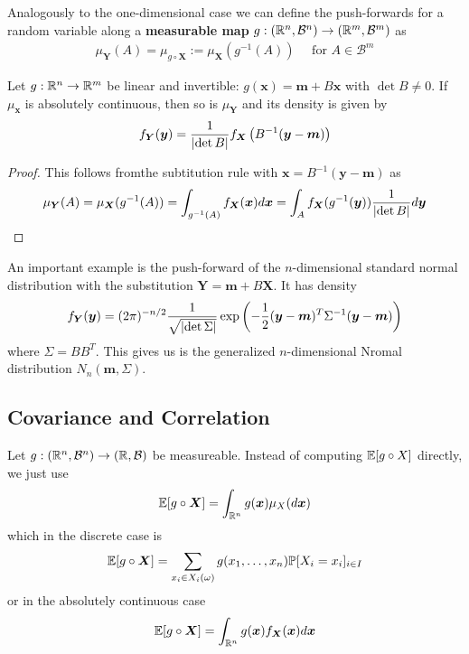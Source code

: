 Analogously to the one-dimensional case we can define the push-forwards for a random variable along a \textbf{measurable map} $g: (\mathbb{R}^{n},\mathcal{B}^{n}) \to (\mathbb{R}^{m},\mathcal{B}^{m})$ as
\begin{align*}
  \mu_{\bm{Y}}(A) = \mu_{g \circ \bm{X}} := \mu_{\bm{X}}(g^{-1}(A)) \quad\text{ for } A \in \mathcal{B}^{m}
\end{align*}

\begin{prop}[]
  Let $g: \mathbb{R}^{n} \to \mathbb{R}^{m}$ be linear and invertible: $g(\bm{x}) = \bm{m} + B \bm{x}$ with $\det B \neq 0$.
  If $\mu_{\bm{x}}$ is absolutely continuous, then so is $\mu_{\bm{Y}}$ and its density is given by
  \begin{align*}
    f_{\bm{Y}}(\bm{y}) = \frac{1}{\abs{\det B}} f_{\bm{X}}\left(
      B^{-1}(\bm{y} - \bm{m})
    \right)
  \end{align*}
\end{prop}
\begin{proof}
  This follows fromthe subtitution rule with $\bm{x} = B^{-1}(\bm{y} - \bm{m})$ as
  \begin{align*}
    \mu_{\bm{Y}}(A) = \mu_{\bm{X}}(g^{-1}(A)) = \int_{g^{-1}(A)}f_{\bm{X}}(\bm{x}) d \bm{x} = \int_A f_{\bm{X}}(g^{-1}(\bm{y})) \frac{1}{\abs{\det B}} d \bm{y}
  \end{align*}
\end{proof}

\begin{ex}[]
An important example is the push-forward of the $n$-dimensional standard normal distribution with the substitution $\bm{Y} = \bm{m} + B \bm{X}$.
It has density
\begin{align*}
  f_{\bm{Y}}(\bm{y}) = (2 \pi)^{-n/2} \frac{1}{\sqrt{\abs{\det \Sigma}}} \exp\left(
    - \frac{1}{2} (\bm{y} - \bm{m})^{T} \Sigma^{-1}(\bm{y} - \bm{m})
  \right)
\end{align*}
where $\Sigma = BB^{T}$.
This gives us is the generalized $n$-dimensional Nromal distribution $N_n(\bm{m},\Sigma)$.
\end{ex}

\subsection{Covariance and Correlation}
Let $g: (\mathbb{R}^{n}, \mathcal{B}^{n}) \to (\mathbb{R},\mathcal{B})$ be measureable. 
Instead of computing $\mathbb{E}[g \circ X]$ directly, we just use
\begin{align*}
  \mathbb{E}[g \circ \bm{X}] = \int_{\mathbb{R}^{n}} g(\bm{x}) \mu_X(d \bm{x})
\end{align*}
which in the discrete case is
\begin{align*}
  \mathbb{E}[g \circ \bm{X}] = \sum_{x_i \in X_i(\omega)}g(x_{1}, \ldots, x_{n}) \mathbb{P}[X_i = x_i]_{i \in I}
\end{align*}
or in the absolutely continuous case
\begin{align*}
  \mathbb{E}[g \circ \bm{X}] = \int_{\mathbb{R}^{n}}g(\bm{x})f_{\bm{X}}(\bm{x}) d \bm{x}
\end{align*}

